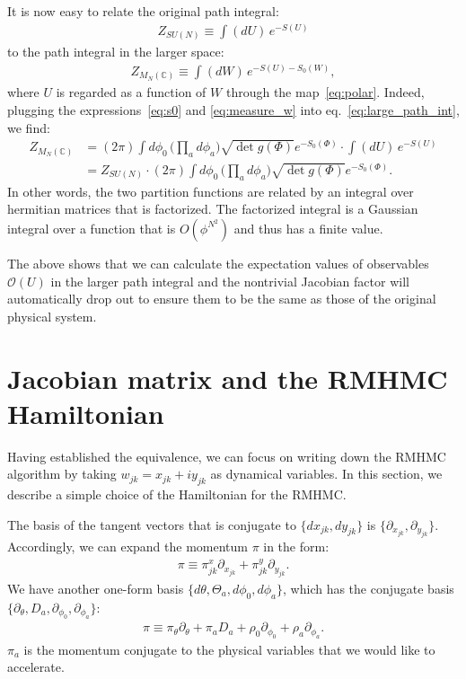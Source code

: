 \documentclass[12pt]{article}
\begin{document}
It is now easy to relate the original path integral:
\begin{align}
  Z_{SU(N)}
  \equiv
  \int(dU)\,
  e^{-S(U)}
\end{align}
to the path integral in the larger space:
\begin{align}
  Z_{M_N(\mathbb{C})}
  \equiv
  \int (dW)\,
  e^{ - S(U)- S_0(W)},
  \label{eq:large_path_int}
\end{align}
where $U$ is regarded as a function of $W$ through the map~\eqref{eq:polar}.
Indeed, plugging the expressions~\eqref{eq:s0} and \eqref{eq:measure_w}
into eq.~\eqref{eq:large_path_int}, we find:
\begin{align}
  Z_{M_N(\mathbb{C})}
  &=
    (2\pi)
    \int
    d\phi_0
    \,
    \Big(\prod_a d\phi_a\Big)
    \sqrt{\det g(\Phi)}
    e^{-S_0(\Phi)}
    \cdot
    \int
    (dU)\, e^{-S(U)} \nonumber \\
  &=
    Z_{SU(N)}
    \cdot
    (2\pi)
    \int
    d\phi_0
    \,
    \Big(\prod_a d\phi_a\Big)
    \sqrt{\det g(\Phi)}
    e^{-S_0(\Phi)}.
\end{align}
In other words,
the two partition functions are related by
an integral over hermitian matrices
that is factorized.
The factorized integral is a Gaussian integral
over a function that is $O(\phi^{N^2})$
and thus has a finite value.

The above shows that we can calculate the expectation values of
observables ${\mathcal O}(U)$ in the larger path integral
and the nontrivial Jacobian factor will automatically drop out
to ensure them to be the same as those of the original physical system.



\section{Jacobian matrix and the RMHMC Hamiltonian}
\label{sec:rmhmc_hamil}

Having established the equivalence,
we can focus on writing down the
RMHMC algorithm by taking
$w_{jk}=x_{jk}+iy_{jk}$ as dynamical variables.
In this section, we describe a simple
choice of the Hamiltonian for the RMHMC.

The basis of the tangent vectors
that is conjugate to $\{dx_{jk}, dy_{jk}\}$
is $\{\partial_{x_{jk}}, \partial_{y_{jk}} \}$.
Accordingly, we can expand the momentum $\pi$ in the form:
\begin{align}
  \pi
  \equiv
  \pi^x_{jk}\partial_{x_{jk}}
  +
  \pi^y_{jk}\partial_{y_{jk}}.
\end{align}
We have another one-form basis
$\{d\theta, \Theta_a, d\phi_0, d\phi_a\}$,
which has the conjugate basis
$\{\partial_\theta, D_a, \partial_{\phi_0}, \partial_{\phi_a} \}$:
\begin{align}
  \pi
  \equiv
  \pi_\theta \partial_{\theta}
  +
  \pi_a D_a
  +
  \rho_0 \partial_{\phi_0}
  +
  \rho_a \partial_{\phi_a}.
\end{align}
$\pi_a$ is the momentum conjugate to the physical variables
that we would like to accelerate.
\end{document}
